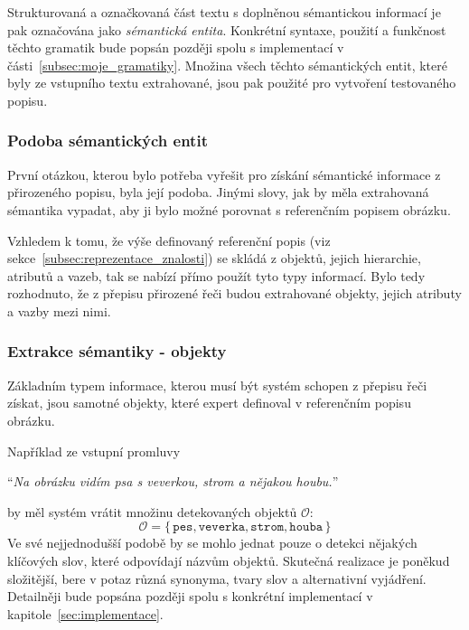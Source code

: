 Strukturovaná a označkovaná část textu s doplněnou sémantickou informací je pak označována jako \emph{sémantická entita}.
Konkrétní syntaxe, použití a funkčnost těchto gramatik bude popsán později spolu s implementací v části~\ref{subsec:moje_gramatiky}.
Množina všech těchto sémantických entit, které byly ze vstupního textu extrahované, jsou pak použité pro vytvoření testovaného popisu.

\subsubsection{Podoba sémantických entit}
První otázkou, kterou bylo potřeba vyřešit pro získání sémantické informace z přirozeného popisu, byla její podoba.
Jinými slovy, jak by měla extrahovaná sémantika vypadat, aby ji bylo možné porovnat s referenčním popisem obrázku.

Vzhledem k tomu, že výše definovaný referenční popis (viz sekce~\ref{subsec:reprezentace_znalosti}) se skládá z objektů, jejich hierarchie, atributů a vazeb,
tak se nabízí přímo použít tyto typy informací.
Bylo tedy rozhodnuto, že z přepisu přirozené řeči budou extrahované objekty, jejich atributy a vazby mezi nimi.

\subsubsection{Extrakce sémantiky - objekty}
Základním typem informace, kterou musí být systém schopen z přepisu řeči získat, jsou samotné objekty, které expert definoval v referenčním popisu obrázku.

Například ze vstupní promluvy
\begin{center}
	\enquote{\emph{Na obrázku vidím psa s veverkou, strom a nějakou houbu.}}
\end{center}
by měl systém vrátit množinu detekovaných objektů $\mathcal{O}$:
\[
	\mathcal O = \bigl\{\, \texttt{pes}, \texttt{veverka}, \texttt{strom}, \texttt{houba}\, \bigr\}
\]
Ve své nejjednodušší podobě by se mohlo jednat pouze o detekci nějakých klíčových slov, které odpovídají názvům objektů.
Skutečná realizace je poněkud složitější, bere v potaz různá synonyma, tvary slov a alternativní vyjádření.
Detailněji bude popsána později spolu s konkrétní implementací v kapitole~\ref{sec:implementace}.

